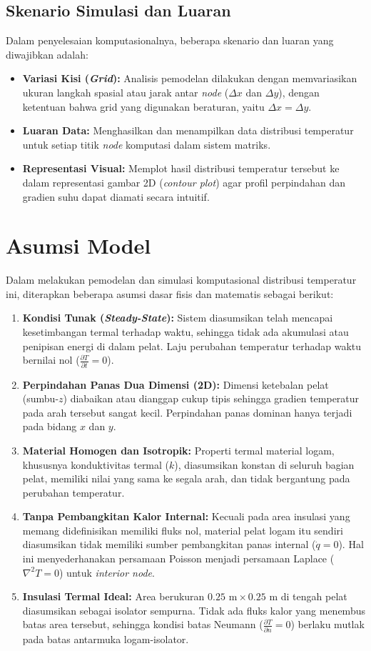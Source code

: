 \documentclass[12pt,a4paper]{article}
\begin{document}
\subsection{Skenario Simulasi dan Luaran}
Dalam penyelesaian komputasionalnya, beberapa skenario dan luaran yang diwajibkan adalah:
\begin{itemize}
    \item \textbf{Variasi Kisi (\textit{Grid}):} Analisis pemodelan dilakukan dengan memvariasikan ukuran langkah spasial atau jarak antar \textit{node} ($\Delta x$ dan $\Delta y$), dengan ketentuan bahwa grid yang digunakan beraturan, yaitu $\Delta x = \Delta y$.
    \item \textbf{Luaran Data:} Menghasilkan dan menampilkan data distribusi temperatur untuk setiap titik \textit{node} komputasi dalam sistem matriks.
    \item \textbf{Representasi Visual:} Memplot hasil distribusi temperatur tersebut ke dalam representasi gambar 2D (\textit{contour plot}) agar profil perpindahan dan gradien suhu dapat diamati secara intuitif.
\end{itemize}

\section{Asumsi Model}
Dalam melakukan pemodelan dan simulasi komputasional distribusi temperatur ini, diterapkan beberapa asumsi dasar fisis dan matematis sebagai berikut:
\begin{enumerate}
    \item \textbf{Kondisi Tunak (\textit{Steady-State}):} Sistem diasumsikan telah mencapai kesetimbangan termal terhadap waktu, sehingga tidak ada akumulasi atau penipisan energi di dalam pelat. Laju perubahan temperatur terhadap waktu bernilai nol ($\frac{\partial T}{\partial t} = 0$).
    \item \textbf{Perpindahan Panas Dua Dimensi (2D):} Dimensi ketebalan pelat (sumbu-$z$) diabaikan atau dianggap cukup tipis sehingga gradien temperatur pada arah tersebut sangat kecil. Perpindahan panas dominan hanya terjadi pada bidang $x$ dan $y$.
    \item \textbf{Material Homogen dan Isotropik:} Properti termal material logam, khususnya konduktivitas termal ($k$), diasumsikan konstan di seluruh bagian pelat, memiliki nilai yang sama ke segala arah, dan tidak bergantung pada perubahan temperatur.
    \item \textbf{Tanpa Pembangkitan Kalor Internal:} Kecuali pada area insulasi yang memang didefinisikan memiliki fluks nol, material pelat logam itu sendiri diasumsikan tidak memiliki sumber pembangkitan panas internal ($\dot{q} = 0$). Hal ini menyederhanakan persamaan Poisson menjadi persamaan Laplace ($\nabla^2 T = 0$) untuk \textit{interior node}.
    \item \textbf{Insulasi Termal Ideal:} Area berukuran $0.25\text{ m} \times 0.25\text{ m}$ di tengah pelat diasumsikan sebagai isolator sempurna. Tidak ada fluks kalor yang menembus batas area tersebut, sehingga kondisi batas Neumann ($\frac{\partial T}{\partial n} = 0$) berlaku mutlak pada batas antarmuka logam-isolator.
\end{enumerate}
\end{document}
